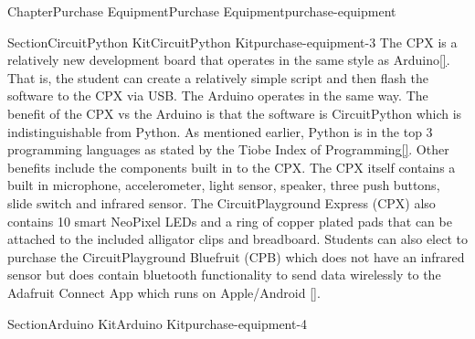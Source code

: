 \documentclass[oneside,10pt,]{book}
\newcommand{\xreffont}{\relax}
\newcommand{\linkhilite}[1]{\underline{#1}}
\numberwithin{equation}{section}
\begin{document}
\begin{chapterptx}{Chapter}{Purchase Equipment}{}{Purchase Equipment}{}{}{purchase-equipment}
\begin{sectionptx}{Section}{CircuitPython Kit}{}{CircuitPython Kit}{}{}{purchase-equipment-3}
The CPX is a relatively new development board that operates in the same style as Arduino\hyperlink{Arduino}{\linkhilite{[{\xreffont 35}]}}. That is, the student can create a relatively simple script and then flash the software to the CPX via USB. The Arduino operates in the same way. The benefit of the CPX vs the Arduino is that the software is CircuitPython which is indistinguishable from Python. As mentioned earlier, Python is in the top 3 programming languages as stated by the Tiobe Index of Programming\hyperlink{Tiobe}{\linkhilite{[{\xreffont 28}]}}. Other benefits include the components built in to the CPX. The CPX itself contains a built in microphone, accelerometer, light sensor, speaker, three push buttons, slide switch and infrared sensor. The CircuitPlayground Express (CPX) also contains 10 smart NeoPixel LEDs and a ring of copper plated pads that can be attached to the included alligator clips and breadboard. Students can also elect to purchase the CircuitPlayground Bluefruit (CPB) which does not have an infrared sensor but does contain bluetooth functionality to send data wirelessly to the Adafruit Connect App which runs on Apple\slash{}Android \hyperlink{AdafruitBLE}{\linkhilite{[{\xreffont 36}]}}.%
\end{sectionptx}
%
%
\typeout{************************************************}
\typeout{************************************************}
%
\begin{sectionptx}{Section}{Arduino Kit}{}{Arduino Kit}{}{}{purchase-equipment-4}

\end{sectionptx}
\end{chapterptx}
\end{document}
